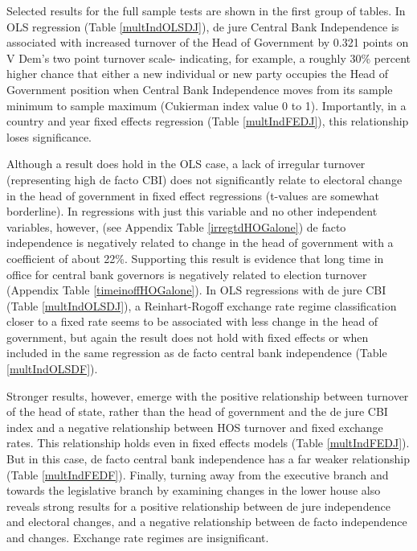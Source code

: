 \documentclass{article}
\begin{document}
    Selected results for the full sample tests are shown in the first group of tables. In OLS regression (Table \ref*{multIndOLSDJ}), de jure Central Bank Independence is associated with increased turnover of the Head of Government by 0.321 points on V Dem’s two point turnover scale- indicating, for example, a roughly 30\% percent higher chance that either a new individual or new party occupies the Head of Government position when Central Bank Independence moves from its sample minimum to sample maximum (Cukierman index value 0 to 1). Importantly, in a country and year fixed effects regression (Table \ref*{multIndFEDJ}), this relationship loses significance.

    
    
    
    

    Although a result does hold in the OLS case, a lack of irregular turnover (representing high de facto CBI) does not significantly relate to electoral change in the head of government in fixed effect regressions (t-values are somewhat borderline). In regressions with just this variable and no other independent variables, however, (see Appendix Table \ref*{irregtdHOGalone}) de facto independence is negatively related to change in the head of government with a coefficient of about 22\%. Supporting this result is evidence that long time in office for central bank governors is negatively related to election turnover (Appendix Table \ref{timeinoffHOGalone}). In OLS regressions with de jure CBI (Table \ref*{multIndOLSDJ}), a Reinhart-Rogoff exchange rate regime classification closer to a fixed rate seems to be associated with less change in the head of government, but again the result does not hold with fixed effects or when included in the same regression as de facto central bank independence (Table \ref{multIndOLSDF}).

    Stronger results, however, emerge with the positive relationship between turnover of the head of state, rather than the head of government and the de jure CBI index and a negative relationship between HOS turnover and fixed exchange rates. This relationship holds even in fixed effects models (Table \ref*{multIndFEDJ}). But in this case, de facto central bank independence has a far weaker relationship (Table \ref*{multIndFEDF}). Finally, turning away from the executive branch and towards the legislative branch by examining changes in the lower house also reveals strong results for a positive relationship between de jure independence and electoral changes, and a negative relationship between de facto independence and changes. Exchange rate regimes are insignificant.
\end{document}
